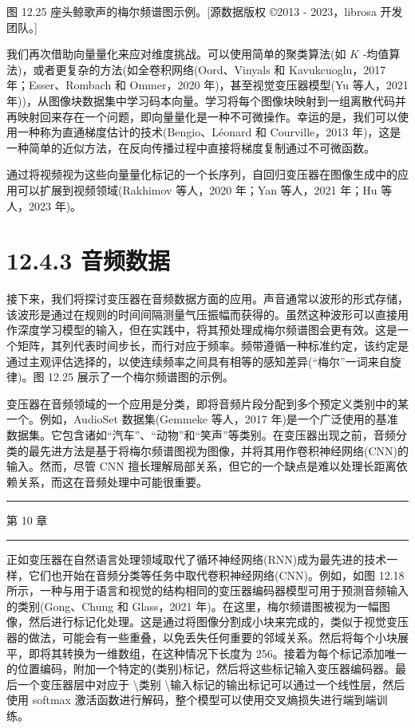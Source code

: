 \documentclass[10pt]{article}
\newcommand{\HRule}{\begin{center}\rule{0.9\linewidth}{0.2mm}\end{center}}
\begin{document}
图 12.25 座头鲸歌声的梅尔频谱图示例。[源数据版权 ©2013 - 2023，librosa 开发团队。]

我们再次借助向量量化来应对维度挑战。可以使用简单的聚类算法(如 \(K\) -均值算法)，或者更复杂的方法(如全卷积网络(Oord、Vinyals 和 Kavukcuoglu，2017 年；Esser、Rombach 和 Ommer，2020 年)，甚至视觉变压器模型(Yu 等人，2021 年))，从图像块数据集中学习码本向量。学习将每个图像块映射到一组离散代码并再映射回来存在一个问题，即向量量化是一种不可微操作。幸运的是，我们可以使用一种称为直通梯度估计的技术(Bengio、Léonard 和 Courville，2013 年)，这是一种简单的近似方法，在反向传播过程中直接将梯度复制通过不可微函数。

通过将视频视为这些向量量化标记的一个长序列，自回归变压器在图像生成中的应用可以扩展到视频领域(Rakhimov 等人，2020 年；Yan 等人，2021 年；Hu 等人，2023 年)。

\section*{12.4.3 音频数据}

接下来，我们将探讨变压器在音频数据方面的应用。声音通常以波形的形式存储，该波形是通过在规则的时间间隔测量气压振幅而获得的。虽然这种波形可以直接用作深度学习模型的输入，但在实践中，将其预处理成梅尔频谱图会更有效。这是一个矩阵，其列代表时间步长，而行对应于频率。频带遵循一种标准约定，该约定是通过主观评估选择的，以使连续频率之间具有相等的感知差异(“梅尔”一词来自旋律)。图 12.25 展示了一个梅尔频谱图的示例。

变压器在音频领域的一个应用是分类，即将音频片段分配到多个预定义类别中的某一个。例如，AudioSet 数据集(Gemmeke 等人，2017 年)是一个广泛使用的基准数据集。它包含诸如“汽车”、“动物”和“笑声”等类别。在变压器出现之前，音频分类的最先进方法是基于将梅尔频谱图视为图像，并将其用作卷积神经网络(CNN)的输入。然而，尽管 CNN 擅长理解局部关系，但它的一个缺点是难以处理长距离依赖关系，而这在音频处理中可能很重要。

\HRule

第 10 章

\HRule

正如变压器在自然语言处理领域取代了循环神经网络(RNN)成为最先进的技术一样，它们也开始在音频分类等任务中取代卷积神经网络(CNN)。例如，如图 12.18 所示，一种与用于语言和视觉的结构相同的变压器编码器模型可用于预测音频输入的类别(Gong、Chung 和 Glass，2021 年)。在这里，梅尔频谱图被视为一幅图像，然后进行标记化处理。这是通过将图像分割成小块来完成的，类似于视觉变压器的做法，可能会有一些重叠，以免丢失任何重要的邻域关系。然后将每个小块展平，即将其转换为一维数组，在这种情况下长度为 256。接着为每个标记添加唯一的位置编码，附加一个特定的⟨类别⟩标记，然后将这些标记输入变压器编码器。最后一个变压器层中对应于 \textbackslash 类别 \textbackslash 输入标记的输出标记可以通过一个线性层，然后使用 softmax 激活函数进行解码，整个模型可以使用交叉熵损失进行端到端训练。
\end{document}
